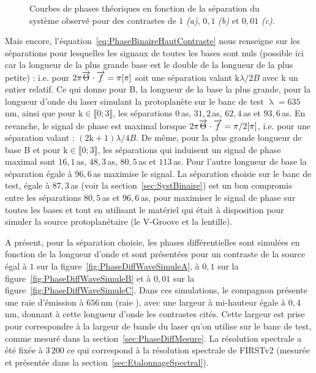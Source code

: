 \begin{figure}[ht!]
\begin{subfigure}{0.5\textwidth}
        \caption{}
        \label{fig:PhaseDiffBinSizeSimuleC}
    \end{subfigure}
    \caption[Courbes de phases théoriques en fonction de la séparation du système observé.]{Courbes de phases théoriques en fonction de la séparation du système observé pour des contrastes de $1$ \textit{(a)}, $0,1$ \textit{(b)} et $0,01$ \textit{(c)}.}
    \label{fig:PhaseDiffBinSizeSimule}
\end{figure}

Mais encore, l'équation~\ref{eq:PhaseBinaireHautContraste} nous renseigne sur les séparations pour lesquelles les signaux de toutes les bases sont nuls (possible ici car la longueur de la plus grande base est le double de la longueur de la plus petite) : i.e. pour $2\pi \overrightarrow{\Theta} \cdot \overrightarrow{f} = \pi [\pi]$ soit une séparation valant $\text{k} \lambda / 2B$ avec k un entier relatif. Ce qui donne pour B, la longueur de la base la plus grande, pour la longueur d'onde du laser simulant la protoplanète sur le banc de test $\uplambda = 635 \,$nm, ainsi que pour $\text{k} \in \llbracket 0; 3 \rrbracket$, les séparations $0 \,$as, $31,2 \,$as, $62,4 \,$as et $93,6 \,$as. En revanche, le signal de phase est maximal lorsque $2\pi \overrightarrow{\Theta} \cdot \overrightarrow{f} = \pi / 2 [\pi]$, i.e. pour une séparation valant : $(2\text{k}+1) \lambda / 4B$. De même, pour la plus grande longueur de base B et pour $\text{k} \in \llbracket 0; 3 \rrbracket$, les séparations qui induisent un signal de phase maximal sont $16,1 \,$as, $48,3 \,$as, $80,5 \,$as et $113 \,$as. Pour l'autre longueur de base la séparation égale à $96,6 \,$as maximise le signal. La séparation choisie sur le banc de test, égale à $87,3 \,$as (voir la section~\ref{sec:SystBinaire}) est un bon compromis entre les séparations $80,5 \,$as et $96,6 \,$as, pour maximiser le signal de phase sur toutes les bases et tout en utilisant le matériel qui était à disposition pour simuler la source protoplanétaire (le V-Groove et la lentille).

A présent, pour la séparation choisie, les phases différentielles sont simulées en fonction de la longueur d'onde et sont présentées pour un contraste de la source égal à $1$ sur la figure~\ref{fig:PhaseDiffWaveSimuleA}, à $0,1$ sur la figure~\ref{fig:PhaseDiffWaveSimuleB} et à $0,01$ sur la figure~\ref{fig:PhaseDiffWaveSimuleC}. Dans ces simulations, le compagnon présente une raie d'émission à $656 \,$nm (raie \ha), avec une largeur à mi-hauteur égale à $0,4 \,$nm, donnant à cette longueur d'onde les contrastes cités. Cette largeur est prise pour correspondre à la largeur de bande du laser qu'on utilise sur le banc de test, comme mesuré dans la section~\ref{sec:PhaseDiffMesure}. La résolution spectrale a été fixée à $3\,200$ ce qui correspond à la résolution spectrale de \ac{FIRSTv2} (mesurée et présentée dans la section~\ref{sec:EtalonnageSpectral}).

